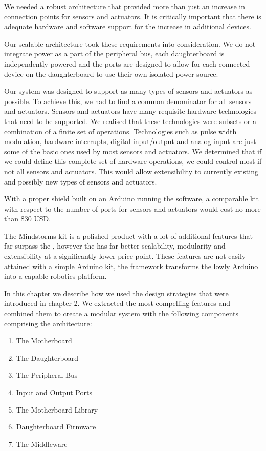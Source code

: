  We needed a robust architecture that provided more than just an increase in connection points for sensors and actuators. It is critically important that there is adequate hardware and software support for the increase in additional devices.

 Our scalable architecture took these requirements into consideration. We do not integrate power as a part of the peripheral bus, each daughterboard is independently powered and the ports are designed to allow for each connected device on the daughterboard to use their own isolated power source.

 Our system was designed to support as many types of sensors and actuators as possible. To achieve this, we had to find a common denominator for all sensors and actuators. Sensors and actuators have many requisite hardware technologies that need to be supported. We realised that these technologies were subsets or a combination of a finite set of operations. Technologies such as pulse width modulation, hardware interrupts, digital input/output and analog input are just some of the basic ones used by most sensors and actuators. We determined that if we could define this complete set of hardware operations, we could control most if not all sensors and actuators. This would allow extensibility to currently existing and possibly new types of sensors and actuators.

 With a proper shield built on an Arduino running the \xten software, a comparable kit with respect to the number of ports for sensors and actuators would cost no more than \$30 USD.

 The Mindstorms kit is a polished product with a lot of additional features that far surpass the \xten, however the \xten has far better scalability, modularity and extensibility at a significantly lower price point. These features are not easily attained with a simple Arduino kit, the framework transforms the lowly Arduino into a capable robotics platform.



In this chapter we describe how we used the design strategies that were introduced in chapter 2. We extracted the most compelling features and combined them to create a modular system with the following components comprising the \xten architecture:
\begin{enumerate}
\item The Motherboard
\item The Daughterboard
\item The Peripheral Bus
\item Input and Output Ports
\item The Motherboard Library
\item Daughterboard Firmware
\item The Middleware
\end{enumerate}

